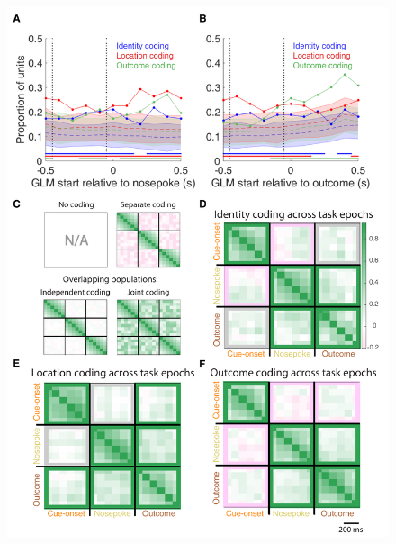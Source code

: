 \documentclass[11pt]{article}
\begin{document}
 \begin{figure}[ht!]
\centering
\includegraphics[height=0.7\textheight]{Fig 8 - Q2.pdf}

\end{figure}
\end{document}
